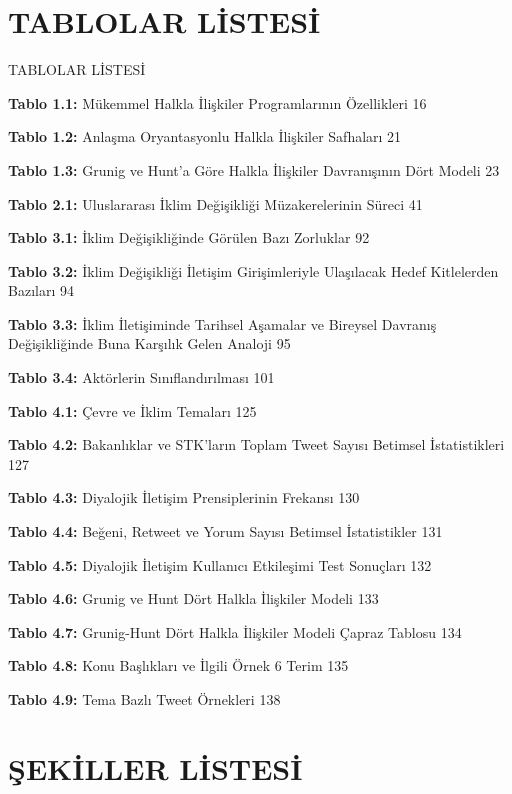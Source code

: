 \documentclass[
]{book}
\begin{document}
\hypertarget{tablolar-listesi}{%
\chapter*{TABLOLAR LİSTESİ}\label{tablolar-listesi}}

TABLOLAR LİSTESİ

\textbf{Tablo 1.1:} Mükemmel Halkla İlişkiler Programlarının Özellikleri 16

\textbf{Tablo 1.2:} Anlaşma Oryantasyonlu Halkla İlişkiler Safhaları 21

\textbf{Tablo 1.3:} Grunig ve Hunt'a Göre Halkla İlişkiler Davranışının Dört Modeli 23

\textbf{Tablo 2.1:} Uluslararası İklim Değişikliği Müzakerelerinin Süreci 41

\textbf{Tablo 3.1:} İklim Değişikliğinde Görülen Bazı Zorluklar 92

\textbf{Tablo 3.2:} İklim Değişikliği İletişim Girişimleriyle Ulaşılacak Hedef Kitlelerden Bazıları 94

\textbf{Tablo 3.3:} İklim İletişiminde Tarihsel Aşamalar ve Bireysel Davranış Değişikliğinde Buna Karşılık Gelen Analoji 95

\textbf{Tablo 3.4:} Aktörlerin Sınıflandırılması 101

\textbf{Tablo 4.1:} Çevre ve İklim Temaları 125

\textbf{Tablo 4.2:} Bakanlıklar ve STK'ların Toplam Tweet Sayısı Betimsel İstatistikleri 127

\textbf{Tablo 4.3:} Diyalojik İletişim Prensiplerinin Frekansı 130

\textbf{Tablo 4.4:} Beğeni, Retweet ve Yorum Sayısı Betimsel İstatistikler 131

\textbf{Tablo 4.5:} Diyalojik İletişim Kullanıcı Etkileşimi Test Sonuçları 132

\textbf{Tablo 4.6:} Grunig ve Hunt Dört Halkla İlişkiler Modeli 133

\textbf{Tablo 4.7:} Grunig-Hunt Dört Halkla İlişkiler Modeli Çapraz Tablosu 134

\textbf{Tablo 4.8:} Konu Başlıkları ve İlgili Örnek 6 Terim 135

\textbf{Tablo 4.9:} Tema Bazlı Tweet Örnekleri 138

\hypertarget{ux15fekiller-listesi}{%
\chapter*{ŞEKİLLER LİSTESİ}\label{ux15fekiller-listesi}}
\end{document}
